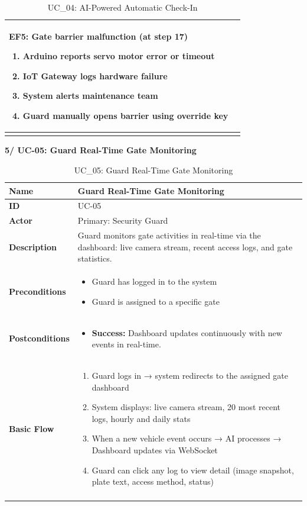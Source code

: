 \documentclass[a4paper]{article}
\newlength{\ucLeft}
\begin{document}
\begin{longtable}{|>{\bfseries}p{\ucLeft}|
                p{\dimexpr\textwidth-\ucLeft-4\tabcolsep-3\arrayrulewidth\relax}|}
\noindent \textbf{EF5: Gate barrier malfunction (at step 17)}
\begin{enumerate}
    \item Arduino reports servo motor error or timeout
    \item IoT Gateway logs hardware failure
    \item System alerts maintenance team
    \item Guard manually opens barrier using override key
\end{enumerate}
\\ \hline
\caption{UC\_04: AI-Powered Automatic Check-In}\label{tab:uc04}
\end{longtable}

\newpage
\noindent \textbf{5/ UC-05: Guard Real-Time Gate Monitoring}
\setlength{\tabcolsep}{6pt}
\renewcommand{\arraystretch}{1.2}
\setlength{\ucLeft}{30mm}

\begin{longtable}{|>{\bfseries}p{\ucLeft}|
                p{\dimexpr\textwidth-\ucLeft-4\tabcolsep-3\arrayrulewidth\relax}|}
\hline
Name & Guard Real-Time Gate Monitoring \\ \hline
ID & UC-05 \\ \hline
Actor & Primary: Security Guard \\ \hline
Description & Guard monitors gate activities in real-time via the dashboard: live camera stream, recent access logs, and gate statistics.\\ \hline
Preconditions &
\begin{itemize}[leftmargin=*, nosep, topsep=0pt, partopsep=0pt, parsep=0pt]
    \item Guard has logged in to the system
    \item Guard is assigned to a specific gate
\end{itemize}
\\ \hline
Postconditions &
\begin{itemize}[leftmargin=*, nosep, topsep=0pt, partopsep=0pt, parsep=0pt, after=\strut]
    \item \textbf{Success:} Dashboard updates continuously with new events in real-time.
\end{itemize}
\\ \hline
Basic Flow & 
\begin{enumerate}[leftmargin=*, nosep, topsep=0pt, partopsep=0pt, parsep=0pt]
    \item Guard logs in → system redirects to the assigned gate dashboard
    \item System displays: live camera stream, 20 most recent logs, hourly and daily stats
    \item When a new vehicle event occurs → AI processes → Dashboard updates via WebSocket
    \item Guard can click any log to view detail (image snapshot, plate text, access method, status)
\end{enumerate}
\\ \hline
\caption{UC\_05: Guard Real-Time Gate Monitoring}\label{tab:uc05}
\end{longtable}
\end{document}
